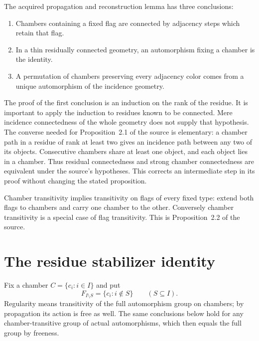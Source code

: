 \documentclass[11pt,a4paper]{article}
\begin{document}
The acquired propagation and reconstruction lemma has three conclusions:
\begin{enumerate}
\item Chambers containing a fixed flag are connected by adjacency steps
which retain that flag.
\item In a thin residually connected geometry, an automorphism fixing a
chamber is the identity.
\item A permutation of chambers preserving every adjacency color comes
from a unique automorphism of the incidence geometry.
\end{enumerate}
The proof of the first conclusion is an induction on the rank of the
residue.  It is important to apply the induction to residues known to be
connected.  Mere incidence connectedness of the whole geometry does not
supply that hypothesis.  The converse needed for Proposition~2.1 of the
source is elementary: a chamber path in a residue of rank at least two
gives an incidence path between any two of its objects.  Consecutive
chambers share at least one object, and each object lies in a chamber.
Thus residual connectedness and strong chamber connectedness are
equivalent under the source's hypotheses.  This corrects an intermediate
step in its proof without changing the stated proposition.

Chamber transitivity implies transitivity on flags of every fixed type:
extend both flags to chambers and carry one chamber to the other.
Conversely chamber transitivity is a special case of flag transitivity.
This is Proposition~2.2 of the source.

\section{The residue stabilizer identity}

Fix a chamber $C=\{c_i:i\in I\}$ and put
\[
             F_{I\setminus S}=\{c_i:i\notin S\}
             \qquad(S\subseteq I).
\]
Regularity means transitivity of the full automorphism group on chambers;
by propagation its action is free as well.  The same conclusions below
hold for any chamber-transitive group of actual automorphisms, which then
equals the full group by freeness.
\end{document}
